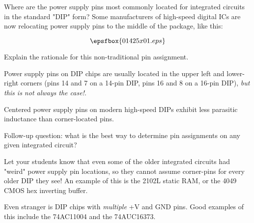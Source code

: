 

Where are the power supply pins most commonly located for integrated circuits in the standard "DIP" form?  Some manufacturers of high-speed digital ICs are now relocating power supply pins to the middle of the package, like this:

$$\epsfbox{01425x01.eps}$$

Explain the rationale for this non-traditional pin assignment.







Power supply pins on DIP chips are usually located in the upper left and lower-right corners (pins 14 and 7 on a 14-pin DIP, pins 16 and 8 on a 16-pin DIP), {\it but this is not always the case!}.

Centered power supply pins on modern high-speed DIPs exhibit less parasitic inductance than corner-located pins.

\vskip 10pt

Follow-up question: what is the best way to determine pin assignments on any given integrated circuit?







Let your students know that even some of the older integrated circuits had "weird" power supply pin locations, so they cannot assume corner-pins for every older DIP they see!  An example of this is the 2102L static RAM, or the 4049 CMOS hex inverting buffer.

Even stranger is DIP chips with {\it multiple} +V and GND pins.  Good examples of this include the 74AC11004 and the 74AUC16373.




